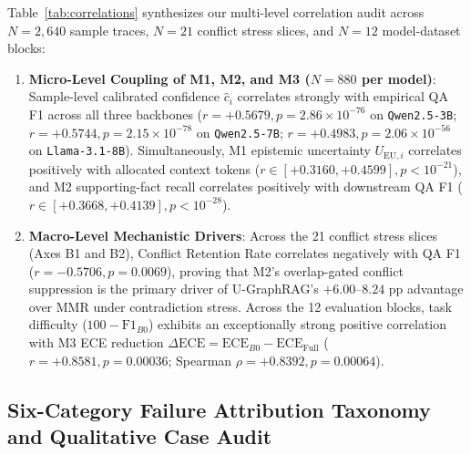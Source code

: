 \documentclass[11pt]{article}
\begin{document}
Table~\ref{tab:correlations} synthesizes our multi-level correlation audit across $N=2,640$ sample traces, $N=21$ conflict stress slices, and $N=12$ model-dataset blocks:
\begin{enumerate}[leftmargin=*,nosep]
    \item \textbf{Micro-Level Coupling of M1, M2, and M3 ($N=880$ per model)}: Sample-level calibrated confidence $\hat{c}_i$ correlates strongly with empirical QA F1 across all three backbones ($r = +0.5679, p = 2.86 \times 10^{-76}$ on \texttt{Qwen2.5-3B}; $r = +0.5744, p = 2.15 \times 10^{-78}$ on \texttt{Qwen2.5-7B}; $r = +0.4983, p = 2.06 \times 10^{-56}$ on \texttt{Llama-3.1-8B}). Simultaneously, M1 epistemic uncertainty $U_{\text{EU}, i}$ correlates positively with allocated context tokens ($r \in [+0.3160, +0.4599], p < 10^{-21}$), and M2 supporting-fact recall correlates positively with downstream QA F1 ($r \in [+0.3668, +0.4139], p < 10^{-28}$).
    \item \textbf{Macro-Level Mechanistic Drivers}: Across the 21 conflict stress slices (Axes B1 and B2), Conflict Retention Rate correlates negatively with QA F1 ($r = -0.5706, p = 0.0069$), proving that M2's overlap-gated conflict suppression is the primary driver of U-GraphRAG's $+6.00\text{--}8.24\text{ pp}$ advantage over MMR under contradiction stress. Across the 12 evaluation blocks, task difficulty ($100 - \text{F1}_{B0}$) exhibits an exceptionally strong positive correlation with M3 ECE reduction $\Delta\text{ECE} = \text{ECE}_{B0} - \text{ECE}_{\text{Full}}$ ($r = +0.8581, p = 0.00036$; Spearman $\rho = +0.8392, p = 0.00064$).
\end{enumerate}

\subsection{Six-Category Failure Attribution Taxonomy and Qualitative Case Audit}
\end{document}
